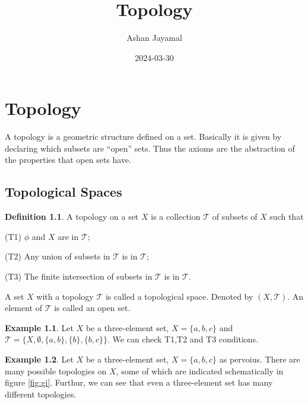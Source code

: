 \documentclass[
]{book}
\title{Topology}
\author{Ashan Jayamal}
\date{2024-03-30}
\theoremstyle{definition}
\newtheorem{definition}{Definition}[chapter]
\theoremstyle{definition}
\newtheorem{example}{Example}[chapter]
\theoremstyle{definition}
\theoremstyle{definition}
\theoremstyle{remark}
\begin{document}
\maketitle

{
\setcounter{tocdepth}{1}
\tableofcontents
}
\hypertarget{topology}{%
\chapter{Topology}\label{topology}}

A topology is a geometric structure defined on a set. Basically it is given by declaring which subsets are ``open'' sets. Thus the axioms are the abstraction of the properties that open sets have.

\hypertarget{topological-spaces}{%
\section{Topological Spaces}\label{topological-spaces}}

\begin{definition}
\protect\hypertarget{def:Top}{}\label{def:Top}A topology on a set \(X\) is a collection \(\mathcal{T}\) of subsets of \(X\) such that

(T1) \(\phi\) and \(X\) are in \(\mathcal{T}\);

(T2) Any union of subsets in \(\mathcal{T}\) is in \(\mathcal{T}\);

(T3) The finite intersection of subsets in \(\mathcal{T}\) is in \(\mathcal{T}\).
\end{definition}

A set \(X\) with a topology \(\mathcal{T}\) is called a topological space. Denoted by \((X,\mathcal{T})\). An element of \(\mathcal{T}\) is called an open set.

\begin{example}
\protect\hypertarget{exm:unnamed-chunk-1}{}\label{exm:unnamed-chunk-1}Let \(X\) be a three-element set, \(X = \{a, b, c\}\) and \(\mathcal{T}=\{X, \emptyset,\{a, b\}, \{b\}, \{b, c\}\}\). We can check T1,T2 and T3 conditions.
\end{example}

\begin{example}
\protect\hypertarget{exm:unnamed-chunk-2}{}\label{exm:unnamed-chunk-2}Let \(X\) be a three-element set, \(X = \{a, b, c\}\) as pervoius. There are many possible topologies on \(X\), some of which are indicated schematically in figure \ref{fig:gi}. Furthur, we can see that even a three-element set has many different topologies.
\end{example}
\end{document}
